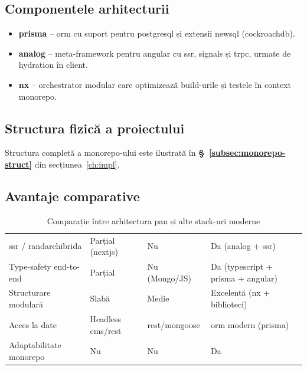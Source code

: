 \subsection{Componentele arhitecturii}
\begin{itemize}
  \item \textbf{\gls{prisma}} – \gls{orm} cu suport pentru \gls{postgresql} și extensii \gls{newsql} (\gls{cockroachdb}).
  \item \textbf{\gls{analog}} – meta-framework pentru \gls{angular} cu \acrfull{ssr}, \gls{signals} și \acrfull{trpc}, urmate de \gls{hydration} în client.
  \item \textbf{\gls{nx}} – orchestrator modular care optimizează \gls{build}-urile și testele în context \gls{monorepo}.
\end{itemize}

\subsection{Structura fizică a proiectului}
Structura completă a \gls{monorepo}-ului este ilustrată în \textbf{§~\ref{subsec:monorepo-struct}} din secțiunea~\ref{ch:impl}.

\subsection{Avantaje comparative}
\begin{table}[H]
  \centering
  \small
  \begin{tabularx}{\linewidth}{@{} Y Y Y Y @{}}
    \toprule
     &  &  &  \\
    \midrule
    \acrshort{ssr} / \gls{randarehibrida}  & Parțial (\gls{nextjs}) & Nu & Da (\gls{analog} + \acrshort{ssr}) \\
    Type-safety end-to-end       & Parțial                 & Nu (Mongo/JS) & Da (\gls{typescript} + \gls{prisma} + \gls{angular}) \\
    Structurare modulară         & Slabă                   & Medie         & Excelentă (\gls{nx} + biblioteci) \\
    Acces la date                & Headless \acrshort{cms}/\acrshort{rest} & \acrshort{rest}/\gls{mongoose} & \gls{orm} modern (\gls{prisma}) \\
    Adaptabilitate \gls{monorepo} & Nu                      & Nu            & Da \\
    \bottomrule
  \end{tabularx}
  \caption{Comparație între arhitectura \gls{pan} și alte stack-uri moderne}
  \label{tab:pan-adv}
\end{table}

